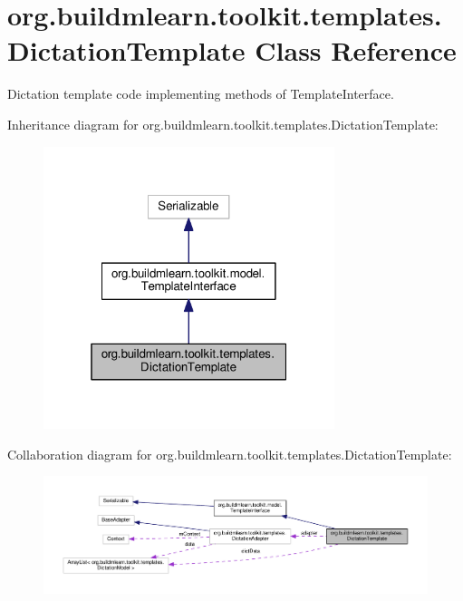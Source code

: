 \hypertarget{classorg_1_1buildmlearn_1_1toolkit_1_1templates_1_1DictationTemplate}{}\section{org.\+buildmlearn.\+toolkit.\+templates.\+Dictation\+Template Class Reference}
\label{classorg_1_1buildmlearn_1_1toolkit_1_1templates_1_1DictationTemplate}


Dictation template code implementing methods of Template\+Interface.  




Inheritance diagram for org.\+buildmlearn.\+toolkit.\+templates.\+Dictation\+Template\+:
\nopagebreak
\begin{figure}[H]
\begin{center}
\leavevmode
\includegraphics[width=241pt]{classorg_1_1buildmlearn_1_1toolkit_1_1templates_1_1DictationTemplate__inherit__graph}
\end{center}
\end{figure}


Collaboration diagram for org.\+buildmlearn.\+toolkit.\+templates.\+Dictation\+Template\+:
\nopagebreak
\begin{figure}[H]
\begin{center}
\leavevmode
\includegraphics[width=350pt]{classorg_1_1buildmlearn_1_1toolkit_1_1templates_1_1DictationTemplate__coll__graph}
\end{center}
\end{figure}
